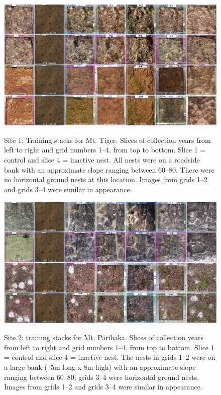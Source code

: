 \begin{figure}\myfloatalign
\includegraphics[width=1\linewidth]{gfx6/train/train-t1} \\
\caption[Site 1: training stacks for Mt. Tiger. ]{Site 1: Training stacks for Mt. Tiger. Slices of collection years from left to right and grid numbers 1--4, from top to bottom. Slice 1 = control and slice 4 = inactive nest. All nests were on a roadside bank with an approximate slope ranging between 60--80\textdegree. There were no horizontal ground nests at this location. Images from grids 1--2 and grids 3--4 were similar in appearance.}\label{fig:train-t1}
\end{figure}

\begin{figure}\myfloatalign
\includegraphics[width=1\linewidth]{gfx6/train/train-p2} \\
\caption[Site 2: training stacks for Mt. Parihaka.]{Site 2: training stacks for Mt. Parihaka. Slices of collection years from left to right and grid numbers 1--4, from top to bottom. Slice 1 = control and slice 4 = inactive nest. The nests in grids 1--2 were on a large bank (~5m long x 8m high) with an approximate slope ranging between 60--80\textdegree; grids 3--4 were horizontal ground nests. Images from grids 1--2 and grids 3--4 were similar in appearance.}\label{fig:train-p2}
\end{figure}


